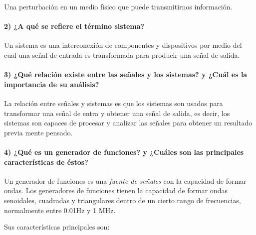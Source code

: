 Una perturbación en un medio físico que puede transmitirnos información.

\paragraph{2) ¿A qué se refiere el término sistema?}

Un sistema es una interconexión de componentes y dispositivos por medio  del  cual  una  señal  de  entrada  es  transformada  para  producir  una  señal  de  salida.


\paragraph{3) ¿Qué relación existe entre las señales y los sistemas? y ¿Cuál es la importancia de su análisis?}

La relación entre señales y sistemas es que los sistemas son usados para transformar una señal de entra y obtener una señal de salida, es decir, los sistemas son capaces de procesar y analizar las señales para obtener un resultado previa mente pensado.

\paragraph{4) ¿Qué es un generador de funciones? y ¿Cuáles son las principales características de éstos?}

Un generador de funciones es una \textit{fuente de señales} con la capacidad de formar ondas. Los generadores de funciones tienen la capacidad de formar ondas senoidales, cuadradas y triangulares dentro de un cierto rango de frecuencias, normalmente entre 0.01Hz y 1 MHz.	

\noindent Sus características principales son:

\small


